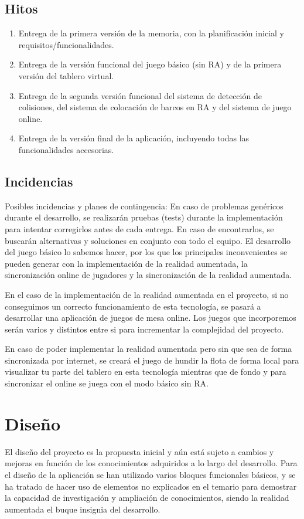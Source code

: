 \documentclass[a4paper, openright, 12pt]{article}
\begin{document}
\subsection{Hitos}
\begin{enumerate}
    \item Entrega de la primera versión de la memoria, con la planificación inicial y requisitos/funcionalidades.
    \item Entrega de la versión funcional del juego básico (sin RA) y de la primera versión del tablero virtual.
    \item Entrega de la segunda versión funcional del sistema de detección de colisiones, del sistema de colocación de barcos en RA y del sistema de juego online.
    \item Entrega de la versión final de la aplicación, incluyendo todas las funcionalidades accesorias.
\end{enumerate}
\subsection{Incidencias}
Posibles incidencias y planes de contingencia:
En caso de problemas genéricos durante el desarrollo, se realizarán pruebas (tests) durante la implementación para intentar corregirlos antes de cada entrega. En caso de encontrarlos, se buscarán alternativas y soluciones en conjunto con todo el equipo. El desarrollo del juego básico lo sabemos hacer, por los que los principales inconvenientes se pueden generar con la implementación de la realidad aumentada, la sincronización online de jugadores y la sincronización de la realidad aumentada.

En el caso de la implementación de la realidad aumentada en el proyecto, si no conseguimos un correcto funcionamiento de esta tecnología, se pasará a desarrollar una aplicación de juegos de mesa online. Los juegos que incorporemos serán varios y distintos entre si para incrementar la complejidad del proyecto.

En caso de poder implementar la realidad aumentada pero sin que sea de forma sincronizada por internet, se creará el juego de hundir la flota de forma local para visualizar tu parte del tablero en esta tecnología mientras que de fondo y para sincronizar el online se juega con el modo básico sin RA.

\section{Diseño}
El diseño del proyecto es la propuesta inicial y aún está sujeto a cambios y mejoras en función de los conocimientos adquiridos a lo largo del desarrollo. Para el diseño de la aplicación se han utilizado varios bloques funcionales básicos, y se ha tratado de hacer uso de elementos no explicados en el temario para demostrar la capacidad de investigación y ampliación de conocimientos, siendo la realidad aumentada el buque insignia del desarrollo.
\end{document}
